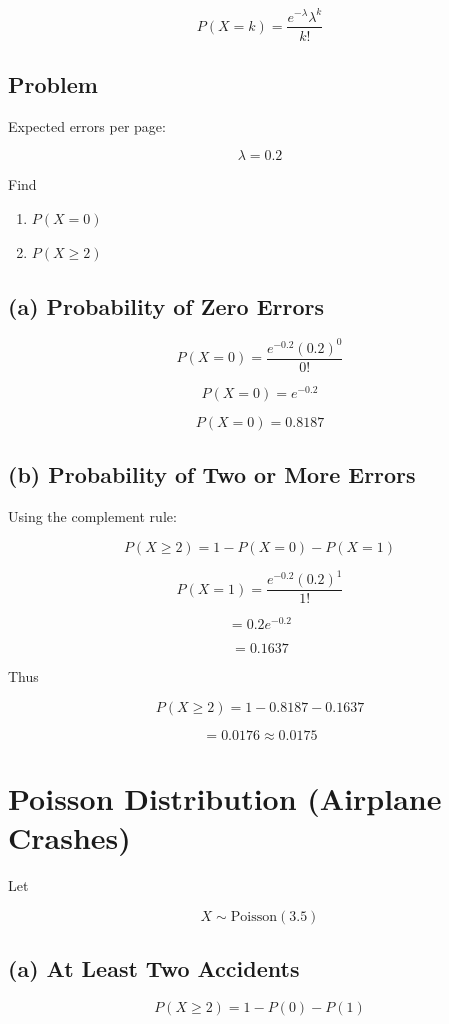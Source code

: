 \documentclass[12pt]{article}
\begin{document}
\[
P(X=k)=\frac{e^{-\lambda}\lambda^k}{k!}
\]

\subsection*{Problem}

Expected errors per page:

\[
\lambda=0.2
\]

Find

\begin{enumerate}
\item $P(X=0)$
\item $P(X\ge2)$
\end{enumerate}

\subsection*{(a) Probability of Zero Errors}

\[
P(X=0)=\frac{e^{-0.2}(0.2)^0}{0!}
\]

\[
P(X=0)=e^{-0.2}
\]

\[
P(X=0)=0.8187
\]

\subsection*{(b) Probability of Two or More Errors}

Using the complement rule:

\[
P(X\ge2)=1-P(X=0)-P(X=1)
\]

\[
P(X=1)=\frac{e^{-0.2}(0.2)^1}{1!}
\]

\[
=0.2e^{-0.2}
\]

\[
=0.1637
\]

Thus

\[
P(X\ge2)=1-0.8187-0.1637
\]

\[
=0.0176\approx0.0175
\]

\section{Poisson Distribution (Airplane Crashes)}

Let

\[
X\sim \text{Poisson}(3.5)
\]

\subsection*{(a) At Least Two Accidents}

\[
P(X\ge2)=1-P(0)-P(1)
\]
\end{document}
